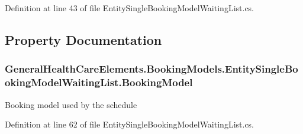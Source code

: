 Definition at line 43 of file Entity\+Single\+Booking\+Model\+Waiting\+List.\+cs.



\subsection{Property Documentation}
\subsubsection[{\texorpdfstring{Booking\+Model}{BookingModel}}]{ General\+Health\+Care\+Elements.\+Booking\+Models.\+Entity\+Single\+Booking\+Model\+Waiting\+List.\+Booking\+Model\hspace{0.3cm}{\ttfamily [get]}}\hypertarget{class_general_health_care_elements_1_1_booking_models_1_1_entity_single_booking_model_waiting_list_a30e90e30df99537cdc7cf0f4cd9f7472}{}\label{class_general_health_care_elements_1_1_booking_models_1_1_entity_single_booking_model_waiting_list_a30e90e30df99537cdc7cf0f4cd9f7472}


Booking model used by the schedule 



Definition at line 62 of file Entity\+Single\+Booking\+Model\+Waiting\+List.\+cs.

